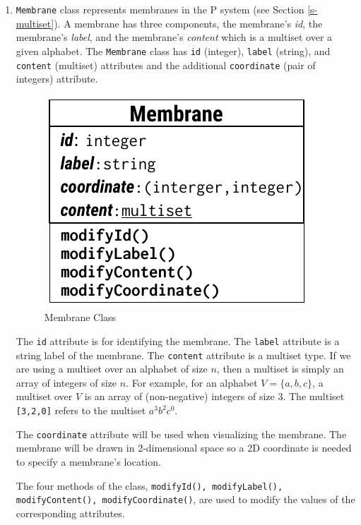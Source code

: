\documentclass{article}
\begin{document}
\begin{enumerate}

\item \texttt{Membrane} class represents membranes in the P system (see Section 
\ref{s-multiset}). A membrane has three components, the membrane's \textit{id}, the membrane's
\textit{label}, and the membrane's \textit{content} which is a multiset over a given alphabet. The
\texttt{Membrane} class has \texttt{id} (integer), \texttt{label} (string), and \texttt{content}
(multiset) attributes and the additional \texttt{coordinate} (pair of integers) attribute.

\begin{figure}[H]
\begin{center}
    \includegraphics[scale=0.8]{figures/zzz-membrane.pdf}
    \caption{Membrane Class}
    \label{fig:membrane}
\end{center}
\end{figure}

The \texttt{id} attribute is for identifying the membrane. The \texttt{label} attribute is a string
label of the membrane. The \texttt{content} attribute is a multiset type. If we are using a multiset
over an alphabet of size $n$, then a multiset is simply an array of integers of size $n$. For 
example, for an alphabet $V=\{a,b,c\}$, a multiset over $V$ is an array of (non-negative) integers 
of size $3$. The multiset \texttt{[3,2,0]} refers to the multiset $a^3b^2c^0$.

The \texttt{coordinate} attribute will be used when visualizing the membrane. The membrane will be
drawn in 2-dimensional space so a 2D coordinate is needed to specify a membrane's location.

The four methods of the class, \texttt{modifyId(), modifyLabel(), modifyContent(), 
modifyCoordinate()}, are used to modify the values of the corresponding attributes.


\end{enumerate}
\end{document}
